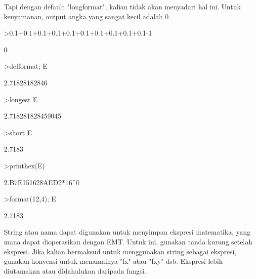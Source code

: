 \documentclass{article}
\begin{document}
\begin{eulernotebook}
\begin{euleroutput}
\end{euleroutput}
\begin{eulercomment}
Tapi dengan default "longformat", kalian tidak akan menyadari hal ini.
Untuk kenyamanan, output angka yang sangat kecil adalah 0.
\end{eulercomment}
\begin{eulerprompt}
>0.1+0.1+0.1+0.1+0.1+0.1+0.1+0.1+0.1+0.1-1
\end{eulerprompt}
\begin{euleroutput}
  0
\end{euleroutput}
\begin{eulerprompt}
>defformat; E
\end{eulerprompt}
\begin{euleroutput}
  2.71828182846
\end{euleroutput}
\begin{eulerprompt}
>longest E
\end{eulerprompt}
\begin{euleroutput}
        2.718281828459045 
\end{euleroutput}
\begin{eulerprompt}
>short E
\end{eulerprompt}
\begin{euleroutput}
  2.7183
\end{euleroutput}
\begin{eulerprompt}
>printhex(E)
\end{eulerprompt}
\begin{euleroutput}
  2.B7E151628AED2*16^0
\end{euleroutput}
\begin{eulerprompt}
>format(12,4); E
\end{eulerprompt}
\begin{euleroutput}
       2.7183 
\end{euleroutput}
\begin{eulercomment}
String atau nama dapat digunakan untuk menyimpan ekspresi matematika,
yang mana dapat dioperasikan dengan EMT. Untuk ini, gunakan tanda
kurung setelah ekspresi. Jika kalian bermaksud untuk menggunakan
string sebagai ekspresi, gunakan konvensi untuk menamainya "fx" atau
"fxy" dsb. Ekspresi lebih diutamakan atau didahulukan daripada fungsi.


\end{eulercomment}
\end{eulernotebook}
\end{document}
